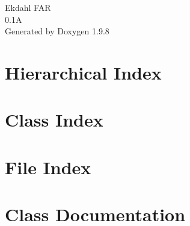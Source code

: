 \documentclass[twoside]{book}
\newcommand{\+}{\discretionary{\mbox{\scriptsize$\hookleftarrow$}}{}{}}
\newcommand{\clearemptydoublepage}{%
    \newpage{\pagestyle{empty}\cleardoublepage}%
  }
\begin{document}
  \raggedbottom
    \hypersetup{pageanchor=false,
                bookmarksnumbered=true,
                pdfencoding=unicode
               }
  \begin{titlepage}
  \vspace*{7cm}
  \begin{center}%
  {\Large Ekdahl FAR}\\
  [1ex]\large 0.\+1A \\
  \vspace*{1cm}
  {\large Generated by Doxygen 1.9.8}\\
  \end{center}
  \end{titlepage}
  \clearemptydoublepage
  \tableofcontents
  \clearemptydoublepage
  \hypersetup{pageanchor=true}


\chapter{Hierarchical Index}

\chapter{Class Index}

\chapter{File Index}

\chapter{Class Documentation}





















































\end{document}
